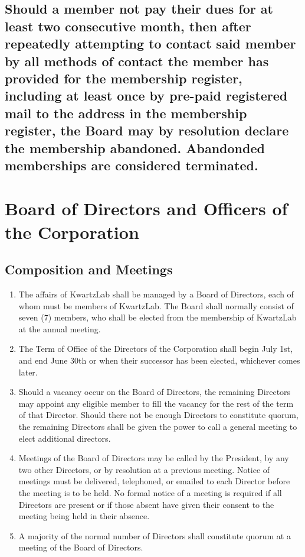 \documentclass{article}
\begin{document}
\subsection{Should a member not pay their dues for at least two consecutive month, then after repeatedly attempting to contact said member by all methods of contact the member has provided for the membership register, including at least once by pre-paid registered mail to the address in the membership register, the Board may by resolution declare the membership abandoned. Abandonded memberships are considered terminated.}

\section{Board of Directors and Officers of the Corporation}

\subsection{Composition and Meetings}

\begin{enumerate}
\item The affairs of KwartzLab shall be managed by a Board of Directors, each of whom must be members of KwartzLab. The Board shall normally consist of seven (7) members, who shall be elected from the membership of KwartzLab at the annual meeting.
\item The Term of Office of the Directors of the Corporation shall begin July 1st, and end June 30th or when their successor has been elected, whichever comes later.
\item Should a vacancy occur on the Board of Directors, the remaining Directors may appoint any eligible member to fill the vacancy for the rest of the term of that Director. Should there not be enough Directors to constitute quorum, the remaining Directors shall be given the power to call a general meeting to elect additional directors.
\item Meetings of the Board of Directors may be called by the President, by any two other Directors, or by resolution at a previous meeting. Notice of meetings must be delivered, telephoned, or emailed to each Director before the meeting is to be held. No formal notice of a meeting is required if all Directors are present or if those absent have given their consent to the meeting being held in their absence.
\item A majority of the normal number of Directors shall constitute quorum at a meeting of the Board of Directors.
\end{enumerate}
\end{document}
